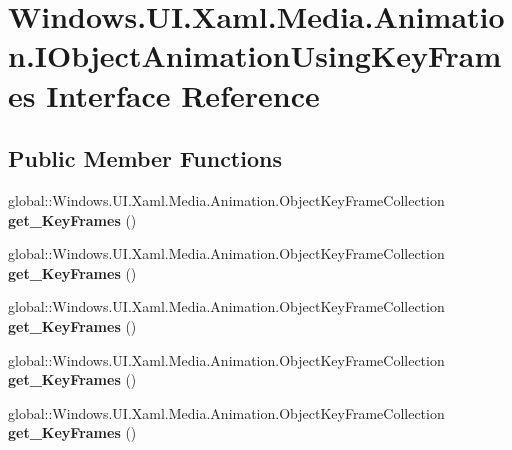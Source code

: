 \hypertarget{interface_windows_1_1_u_i_1_1_xaml_1_1_media_1_1_animation_1_1_i_object_animation_using_key_frames}{}\section{Windows.\+U\+I.\+Xaml.\+Media.\+Animation.\+I\+Object\+Animation\+Using\+Key\+Frames Interface Reference}
\label{interface_windows_1_1_u_i_1_1_xaml_1_1_media_1_1_animation_1_1_i_object_animation_using_key_frames}
\subsection*{Public Member Functions}
\begin{DoxyCompactItemize}
\item 
\mbox{\label{interface_windows_1_1_u_i_1_1_xaml_1_1_media_1_1_animation_1_1_i_object_animation_using_key_frames_af9e6594e30ef5d590174fc0e5cd85493}} 
global\+::\+Windows.\+U\+I.\+Xaml.\+Media.\+Animation.\+Object\+Key\+Frame\+Collection {\bfseries get\+\_\+\+Key\+Frames} ()
\item 
\mbox{\label{interface_windows_1_1_u_i_1_1_xaml_1_1_media_1_1_animation_1_1_i_object_animation_using_key_frames_af9e6594e30ef5d590174fc0e5cd85493}} 
global\+::\+Windows.\+U\+I.\+Xaml.\+Media.\+Animation.\+Object\+Key\+Frame\+Collection {\bfseries get\+\_\+\+Key\+Frames} ()
\item 
\mbox{\label{interface_windows_1_1_u_i_1_1_xaml_1_1_media_1_1_animation_1_1_i_object_animation_using_key_frames_af9e6594e30ef5d590174fc0e5cd85493}} 
global\+::\+Windows.\+U\+I.\+Xaml.\+Media.\+Animation.\+Object\+Key\+Frame\+Collection {\bfseries get\+\_\+\+Key\+Frames} ()
\item 
\mbox{\label{interface_windows_1_1_u_i_1_1_xaml_1_1_media_1_1_animation_1_1_i_object_animation_using_key_frames_af9e6594e30ef5d590174fc0e5cd85493}} 
global\+::\+Windows.\+U\+I.\+Xaml.\+Media.\+Animation.\+Object\+Key\+Frame\+Collection {\bfseries get\+\_\+\+Key\+Frames} ()
\item 
\mbox{\label{interface_windows_1_1_u_i_1_1_xaml_1_1_media_1_1_animation_1_1_i_object_animation_using_key_frames_af9e6594e30ef5d590174fc0e5cd85493}} 
global\+::\+Windows.\+U\+I.\+Xaml.\+Media.\+Animation.\+Object\+Key\+Frame\+Collection {\bfseries get\+\_\+\+Key\+Frames} ()
\end{DoxyCompactItemize}



